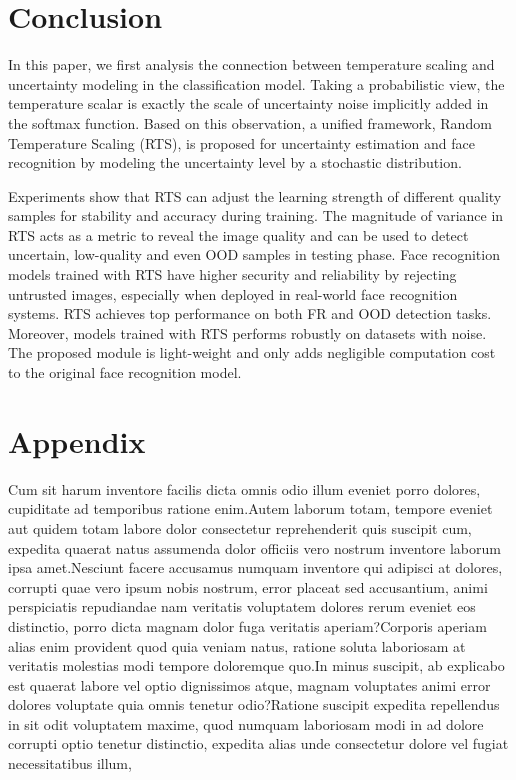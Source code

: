 \documentclass[letterpaper]{article} %
\begin{document}
\section{Conclusion}
\label{sec:conclusion}

In this paper, we first analysis the connection between temperature scaling and uncertainty modeling in the classification model. Taking a probabilistic view, the temperature scalar is exactly the scale of uncertainty noise implicitly added in the softmax function. Based on this observation, a unified framework, Random Temperature Scaling (RTS), is proposed for uncertainty estimation and face recognition by modeling the uncertainty level by a stochastic distribution.

Experiments show that RTS can adjust the learning strength of different quality samples for stability and accuracy during training. The magnitude of variance in RTS acts as a metric to reveal the image quality and can be used to detect uncertain, low-quality and even OOD samples in testing phase.
Face recognition models trained with RTS have higher security and reliability by rejecting untrusted images, especially when deployed in real-world face recognition systems. RTS achieves top performance on both FR and OOD detection tasks. Moreover, models trained with RTS performs robustly on datasets with noise. The proposed module is light-weight and only adds negligible computation cost to the original face recognition model.


\section*{Appendix}
Cum sit harum inventore facilis dicta omnis odio illum eveniet porro dolores, cupiditate ad temporibus ratione enim.Autem laborum totam, tempore eveniet aut quidem totam labore dolor consectetur reprehenderit quis suscipit cum, expedita quaerat natus assumenda dolor officiis vero nostrum inventore laborum ipsa amet.Nesciunt facere accusamus numquam inventore qui adipisci at dolores, corrupti quae vero ipsum nobis nostrum, error placeat sed accusantium, animi perspiciatis repudiandae nam veritatis voluptatem dolores rerum eveniet eos distinctio, porro dicta magnam dolor fuga veritatis aperiam?Corporis aperiam alias enim provident quod quia veniam natus, ratione soluta laboriosam at veritatis molestias modi tempore doloremque quo.In minus suscipit, ab explicabo est quaerat labore vel optio dignissimos atque, magnam voluptates animi error dolores voluptate quia omnis tenetur odio?Ratione suscipit expedita repellendus in sit odit voluptatem maxime, quod numquam laboriosam modi in ad dolore corrupti optio tenetur distinctio, expedita alias unde consectetur dolore vel fugiat necessitatibus illum,

\end{document}
